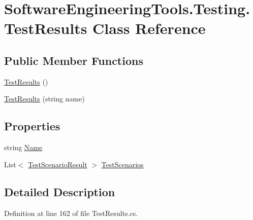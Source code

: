 \hypertarget{class_software_engineering_tools_1_1_testing_1_1_test_results}{\section{Software\+Engineering\+Tools.\+Testing.\+Test\+Results Class Reference}
\label{class_software_engineering_tools_1_1_testing_1_1_test_results}
}
\subsection*{Public Member Functions}
\begin{DoxyCompactItemize}
\item 
\hyperlink{class_software_engineering_tools_1_1_testing_1_1_test_results_a62c17df9d573027e25f1405837f7a640}{Test\+Results} ()
\item 
\hyperlink{class_software_engineering_tools_1_1_testing_1_1_test_results_ab58ea4250db18fbc4d527ec8ef66934c}{Test\+Results} (string name)
\end{DoxyCompactItemize}
\subsection*{Properties}
\begin{DoxyCompactItemize}
\item 
string \hyperlink{class_software_engineering_tools_1_1_testing_1_1_test_results_af99977749c177523bcc298652bdde8c2}{Name}
\item 
List$<$ \hyperlink{class_software_engineering_tools_1_1_testing_1_1_test_scenario_result}{Test\+Scenario\+Result} $>$ \hyperlink{class_software_engineering_tools_1_1_testing_1_1_test_results_ac90e7e412834351717bad9a9ccb39366}{Test\+Scenarios}
\end{DoxyCompactItemize}


\subsection{Detailed Description}


Definition at line 162 of file Test\+Results.\+cs.



